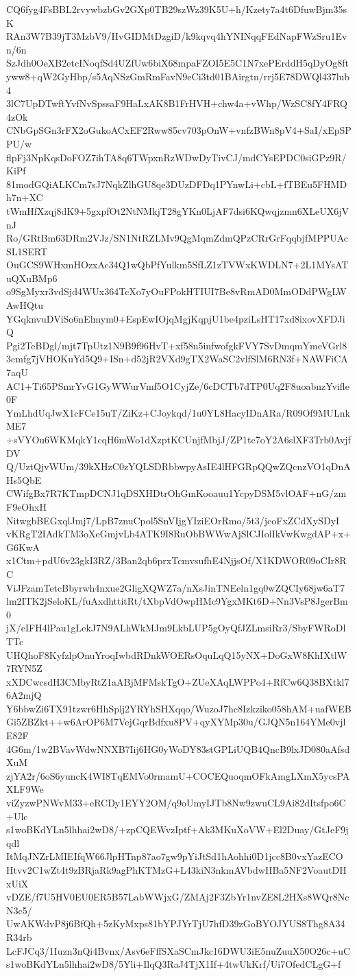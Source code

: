CQ6fyg4FsBBL2rvywbzbGv2GXp0TB29szWz39K5U+h/Kzety7a4t6DfuwBjm35sK
RAn3W7B39jT3MzbV9/HvGIDMtDzgiD/k9kqvq4hYNINqqFEdNapFWzSru1Evn/6n
SzJdh0OeXB2etcINoqfSd4UZfUw6biX68mpaFZOI5E5C1N7xePErddH5qDyOg8ft
yww8+qW2GyHbp/s5AqNSzGmRmFavN9eCi3td01BAirgtn/rrj5E78DWQl437lub4
3lC7UpDTwftYvfNvSpssaF9HaLxAK8B1FrHVH+chw4a+vWhp/WzSC8fY4FRQ4zOk
CNbGpSGn3rFX2oGukoACxEF2Rww85cv703pOnW+vnfzBWn8pV4+SaI/xEpSPPU/w
flpFj3NpKqsDoFOZ7ihTA8q6TWpxnRzWDwDyTivCJ/mdCYsEPDC0siGPz9R/KiPf
81modGQiALKCm7sJ7NqkZlhGU8qe3DUzDFDq1PYnwLi+cbL+fTBEu5FHMDh7n+XC
tWmHfXzqj8dK9+5gxpfOt2NtNMkjT28gYKn0LjAF7dsi6KQwqjzmn6XLeUX6jVnJ
Ro/GRtBm63DRm2VJz/SN1NtRZLMv9QgMqmZdmQPzCRrGrFqqbjfMPPUAcSL1SERT
OuGCS9WHxmHOzxAc34Q1wQbPfYulkm5SfLZ1zTVWxKWDLN7+2L1MYsATuQXuBMp6
o9SgMyxr3vdSjd4WUx364TcXo7yOuFPokHTIUI7Be8vRmAD0MmODdPWgLWAwHQtu
YGqknvuDViSo6nElmym0+EspEwIOjqMgjKqpjU1be4pziLsHT17xd8ixovXFDJiQ
Pgi2TeBDgl/mjt7TpUtz1N9B9f96HvT+xf58n5infwofgkFVY7SvDmqmYmeVGrl8
3cmfg7jVHOKuYd5Q9+ISn+d52jR2VXd9gTX2WaSC2vlfSlM6RN3f+NAWFiCA7aqU
AC1+Ti65PSmrYvG1GyWWurVmf5O1CyjZe/6cDCTb7dTP0Uq2F8uoabnzYvifle0F
YmLhdUqJwX1cFCe15uT/ZiKz+CJoykqd/1u0YL8HacyIDnARa/R09Of9MULnkME7
+sVYOu6WKMqkY1cqH6mWo1dXzptKCUnjfMbjJ/ZP1tc7oY2A6slXF3Trb0AvjfDV
Q/UztQjvWUm/39kXHzC0zYQLSDRbbwpyAsIE4lHFGRpQQwZQcnzVO1qDnAHs5QbE
CWifgBx7R7KTmpDCNJ1qDSXHDtrOhGmKooauu1YcpyDSM5vlOAF+nG/zmF9eOhxH
NitwgbBEGxqlJmj7/LpB7znuCpol5SnVIjgYIziEOrRmo/5t3/jcoFxZCdXySDyI
vKRgT2IAdkTM3oXeGmjvLb4ATK9I8RuObBWWwAjSlCJIolIkVwKwgdAP+x+G6KwA
x1Ctm+pdU6v23gkI3RZ/3Ban2qb6prxTcmvsufhE4NjjsOf/X1KDWOR09oCIr8RC
ViJFzamTetcBbyrwh4nxue2GligXQWZ7a/nXsJinTNEeln1gq0wZQCIy68jw6aT7
lm2ITK2jSeloKL/fuAxdhttitRt/tXbpVdOwpHMc9YgxMKt6D+Nn3VsP8JgerBm0
jX/eIFH4lPau1gLekJ7N9ALhWkMJm9LkbLUP5gOyQfJZLmsiRr3/SbyFWRoDlTTc
UHQhoF8KyfzlpOnuYroqIwbdRDnkWOERsOquLqQ15yNX+DoGxW8KhIXtlW7RYN5Z
xXDCwcsdH3CMbyRtZ1aABjMFMskTgO+ZUeXAqLWPPo4+RfCw6Q38BXtkl76A2mjQ
Y6bbwZi6TX91tzwr6HhSplj2YRYhSHXqqo/WuzoJ7hc8Izkziko058hAM+uafWEB
Gi5ZBZkt++w6ArOP6M7VejGqrBdfxu8PV+qyXYMp30u/GJQN5n164YMe0vjlE82F
4G6m/1w2BVavWdwNNXB7Iij6HG0yWoDY83stGPLiUQB4QncB9lxJD080aAfsdXuM
zjYA2r/6oS6yuncK4WI8TqEMVo0rmamU+COCEQuoqmOFkAmgLXmX5ycsPAXLF9We
viZyzwPNWvM33+eRCDy1EYY2OM/q9oUmyIJTb8Nw9zwuCL9Ai82dItsfpo6C+Ulc
s1woBKdYLn5lhhai2wD8/+zpCQEWvzIptf+Ak3MKuXoVW+El2Duay/GtJeF9jqdl
ItMqJNZrLMIEIfqW66JlpHTnp87ao7gw9pYiJtSd1hAohhi0D1jcc8B0vxYazECO
Htvv2C1wZt4t9zBRjaRk9agPhKTMzG+L43kiN3nkmAVbdwHBa5NF2VoautDHxUiX
vDZE/f7U5HV0EU0ER5B57LabWWjxG/ZMAj2F3ZbYr1nvZE8L2HXs8WQr8NcN3c5/
UwAKWdvP8j6BfQh+5zKyMxps81bYPJYrTjU7hfD39zGoBYOJYUS8Thg8A34R34rb
LcFJCq3/1Iuzn3nQi4Bvnx/Asv6eFffSXaSCmJkc16DWU3iE5nuZuuX50O26c+uC
s1woBKdYLn5lhhai2wD8/5Yli+IlqQ3RaJ4TjX1If+4twUkKrf/Ui7OfedCLgG+f
